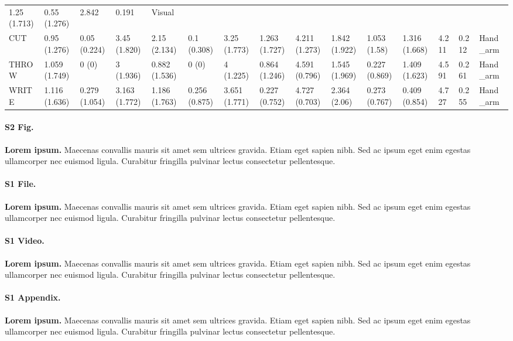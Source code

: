 \documentclass[10pt,letterpaper]{article}
\begin{document}
\begin{table}[]
{\begin{tabular}{@{}lllllllllllllll@{}}
  1.25 (1.713) &
  0.55 (1.276) &
  2.842 &
  0.191 &
  Visual \\
\rowcolor[HTML]{EFEFEF} 
CUT &
  0.95 (1.276) &
  0.05 (0.224) &
  3.45 (1.820) &
  2.15 (2.134) &
  0.1 (0.308) &
  3.25 (1.773) &
  1.263 (1.727) &
  4.211 (1.273) &
  1.842 (1.922) &
  1.053 (1.58) &
  1.316 (1.668) &
  4.211 &
  0.212 &
  Hand\_arm \\
THROW &
  1.059 (1.749) &
  0 (0) &
  3 (1.936) &
  0.882 (1.536) &
  0 (0) &
  4 (1.225) &
  0.864 (1.246) &
  4.591 (0.796) &
  1.545 (1.969) &
  0.227 (0.869) &
  1.409 (1.623) &
  4.591 &
  0.261 &
  Hand\_arm \\
\rowcolor[HTML]{EFEFEF} 
WRITE &
  1.116 (1.636) &
  0.279 (1.054) &
  3.163 (1.772) &
  1.186 (1.763) &
  0.256 (0.875) &
  3.651 (1.771) &
  0.227 (0.752) &
  4.727 (0.703) &
  2.364 (2.06) &
  0.273 (0.767) &
  0.409 (0.854) &
  4.727 &
  0.255 &
  Hand\_arm \\ \bottomrule
\end{tabular}%
}
\end{table}




\paragraph*{S2 Fig.}
\label{S2_Fig}
{\bf Lorem ipsum.} Maecenas convallis mauris sit amet sem ultrices gravida. Etiam eget sapien nibh. Sed ac ipsum eget enim egestas ullamcorper nec euismod ligula. Curabitur fringilla pulvinar lectus consectetur pellentesque.

\paragraph*{S1 File.}
\label{S1_File}
{\bf Lorem ipsum.}  Maecenas convallis mauris sit amet sem ultrices gravida. Etiam eget sapien nibh. Sed ac ipsum eget enim egestas ullamcorper nec euismod ligula. Curabitur fringilla pulvinar lectus consectetur pellentesque.

\paragraph*{S1 Video.}
\label{S1_Video}
{\bf Lorem ipsum.}  Maecenas convallis mauris sit amet sem ultrices gravida. Etiam eget sapien nibh. Sed ac ipsum eget enim egestas ullamcorper nec euismod ligula. Curabitur fringilla pulvinar lectus consectetur pellentesque.

\paragraph*{S1 Appendix.}
\label{S1_Appendix}
{\bf Lorem ipsum.} Maecenas convallis mauris sit amet sem ultrices gravida. Etiam eget sapien nibh. Sed ac ipsum eget enim egestas ullamcorper nec euismod ligula. Curabitur fringilla pulvinar lectus consectetur pellentesque.
\end{document}
